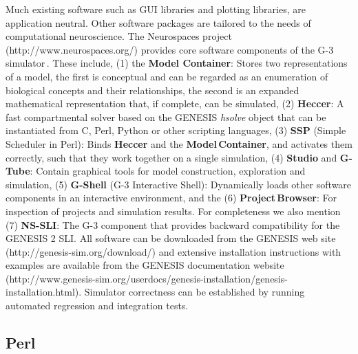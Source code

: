 \documentclass[12pt]{article}
\begin{document}
Much existing software such as GUI libraries and plotting libraries,
are application neutral.  Other software packages are tailored to the
needs of computational neuroscience.  The Neurospaces project
(http://www.neurospaces.org/) provides core software components of the
G-3 simulator\,\cite{cornelis03:_neuros}. These include, (1) the {\bf
  Model Container}: Stores two representations of a model, the first
is conceptual and can be regarded as an enumeration of biological
concepts and their relationships, the second is an expanded
mathematical representation that, if complete, can be simulated, (2)
{\bf Heccer}: A fast compartmental solver based on the GENESIS {\it
  hsolve} object that can be instantiated from C, Perl, Python or
other scripting languages, (3) {\bf SSP} (Simple Scheduler in Perl):
Binds {\bf Heccer} and the {\bf Model\,Container}, and activates them
correctly, such that they work together on a single simulation, (4)
{\bf Studio} and {\bf G-Tube}: Contain graphical tools for model
construction, exploration and simulation, (5) {\bf G-Shell} (G-3
Interactive Shell): Dynamically loads other software components in an
interactive environment, and the (6) {\bf Project\,Browser}: For
inspection of projects and simulation results. For completeness we
also mention (7) {\bf NS-SLI}: The G-3 component that provides
backward compatibility for the GENESIS 2 SLI. All software can be
downloaded from the GENESIS web site
(http://genesis-sim.org/download/) and extensive installation
instructions with examples are available from the GENESIS
documentation website
(http://www.genesis-sim.org/userdocs/genesis-installation/genesis-installation.html).
Simulator correctness can be established by running automated
regression and integration tests.

\subsection{Perl}
\end{document}
